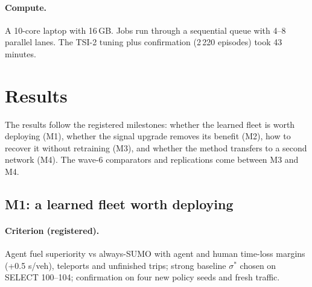 \documentclass[11pt]{article}
\begin{document}
\paragraph{Compute.} A 10-core laptop with 16\,GB. Jobs run through a sequential queue with 4--8 parallel lanes. The TSI-2 tuning plus
confirmation (2\,220 episodes) took 43 minutes.
\begin{table}[t]\centering\small
\caption{Seeds and panels. Traffic panels were generated after a non-existence check; no traffic panel was used both to choose and to
confirm. Light checkpoints t4--t8 and fleet checkpoints s213--s513 are reused across the grid4 confirmations, so those are fresh-traffic,
not fresh-policy, replications.}\label{tab:panels}
\end{table}

\section{Results}\label{sec:results}
The results follow the registered milestones: whether the learned fleet is worth deploying (M1), whether the signal upgrade removes its benefit (M2), how to recover it without retraining (M3), and whether the method transfers to a second network (M4). The wave-6 comparators and replications come between M3 and M4.
\subsection{M1: a learned fleet worth deploying}\label{sec:m1}
\paragraph{Criterion (registered).} Agent fuel superiority vs always-SUMO with agent and human time-loss margins (+0.5 s/veh),
teleports and unfinished trips; strong baseline $\sigma^*$ chosen on SELECT 100--104; confirmation on four new policy seeds and fresh traffic.
\end{document}
